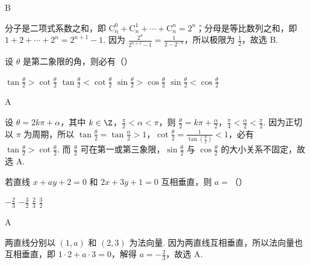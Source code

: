 \documentclass[UTF8,a4paper,oneside,11pt]{ctexbook}
\begin{document}
\begin{answer}
B
\end{answer}

\begin{solution}
分子是二项式系数之和，即 \(\mathrm C_n^0+\mathrm C_n^1+\cdots+\mathrm C_n^n=2^{n}\)；分母是等比数列之和，即 \(1+2+\cdots+2^{n}=2^{n+1}-1\). 因为 \(\frac{2^{n}}{2^{n+1}-1}=\frac{1}{2-2^{-n}}\)，所以极限为 \(\frac{1}{2}\)，故选 B.
\end{solution}

\begin{problem}
设 \(\theta\) 是第二象限的角，则必有（\quad）

\choices
    {\(\tan\frac{\theta}{2}>\cot\frac{\theta}{2}\)}
    {\(\tan\frac{\theta}{2}<\cot\frac{\theta}{2}\)}
    {\(\sin\frac{\theta}{2}>\cos\frac{\theta}{2}\)}
    {\(\sin\frac{\theta}{2}<\cos\frac{\theta}{2}\)}
\end{problem}

\begin{answer}
A
\end{answer}

\begin{solution}
设 \(\theta=2k\pi+\alpha\)，其中 \(k\in\Z\)，\(\frac{\pi}{2}<\alpha<\pi\)，则 \(\frac{\theta}{2}=k\pi+\frac{\alpha}{2}\)，\(\frac{\pi}{4}<\frac{\alpha}{2}<\frac{\pi}{2}\). 因为正切以 \(\pi\) 为周期，所以 \(\tan\frac{\theta}{2}=\tan\frac{\alpha}{2}>1\)，\(\cot\frac{\theta}{2}=\frac{1}{\tan(\frac{\theta}{2})}<1\)，必有 \(\tan\frac{\theta}{2}>\cot\frac{\theta}{2}\). 而 \(\frac{\theta}{2}\) 可在第一或第三象限，\(\sin\frac{\theta}{2}\) 与 \(\cos\frac{\theta}{2}\) 的大小关系不固定，故选 A.
\end{solution}

\begin{problem}
若直线 \(x+ay+2=0\) 和 \(2x+3y+1=0\) 互相垂直，则 \(a=\)（\quad）

\choices
    {\(-\frac{2}{3}\)}
    {\(-\frac{3}{2}\)}
    {\(\frac{2}{3}\)}
    {\(\frac{3}{2}\)}
\end{problem}

\begin{answer}
A
\end{answer}

\begin{solution}
两直线分别以 \(\left( 1,a \right)\) 和 \(\left( 2,3 \right)\) 为法向量. 因为两直线互相垂直，所以法向量也互相垂直，即 \(1\cdot 2+a\cdot 3=0\)，解得 \(a=-\frac{2}{3}\)，故选 A.
\end{solution}
\end{document}
